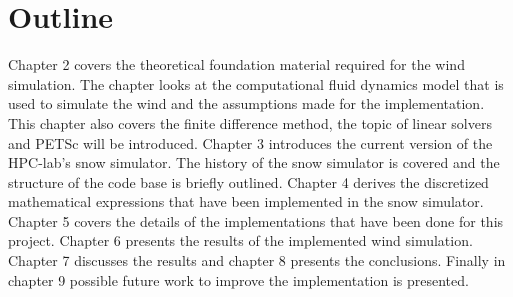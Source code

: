 \section{Outline}

Chapter 2 covers the theoretical foundation material required for the wind
simulation. The chapter looks at the computational fluid dynamics model that is
used to simulate the wind and the assumptions made for the implementation. This
chapter also covers the finite difference method, the topic of linear solvers
and PETSc will be introduced. Chapter 3 introduces the current version of the
HPC-lab's snow simulator. The history of the snow simulator is covered and the
structure of the code base is briefly outlined. Chapter 4 derives the
discretized mathematical expressions that have been implemented in the snow
simulator. Chapter 5 covers the details of the implementations that have been
done for this project. Chapter 6 presents the results of the implemented wind
simulation. Chapter 7 discusses the results and chapter 8 presents the
conclusions. Finally in chapter 9 possible future work to improve the
implementation is presented.
